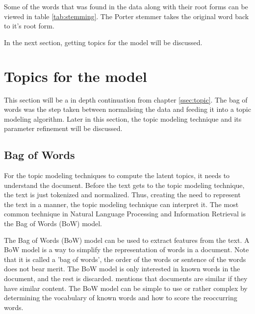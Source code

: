 Some of the words that was found in the data along with their root forms can be viewed in table \ref{tab:stemming}. The Porter stemmer takes the original word back to it's root form.

In the next section, getting topics for the model will be discussed.

\section{Topics for the model}
This section will be a in depth continuation from chapter \ref{ssec:topic}. The bag of words was the step  taken between normalising the data and feeding it into a topic modeling algorithm. Later in this section, the topic modeling technique and its parameter refinement will be discussed.

\subsection{Bag of Words}
For the topic modeling techniques to compute the latent topics, it needs to understand the document. Before the text gets to the topic modeling technique, the text is just tokenized and normalized. Thus, creating the need to represent the text in a manner, the topic modeling technique can interpret it. The most common technique in Natural Language Processing and Information Retrieval is the Bag of Words (BoW) model.

The Bag of Words (BoW) model can be used to extract features from the text. A BoW model is a way to simplify the representation of words in a document. Note that it is called a 'bag of words', the order of the words or sentence of the words does not bear merit. The BoW model is only interested in known words in the document, and the rest is discarded.  mentions that documents are similar if they have similar content. The BoW model can be simple to use or rather complex by determining the vocabulary of known words and how to score the reoccurring words. 

